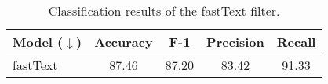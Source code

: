 \begin{table}[ht]
\centering
\fontsize{8}{10}\selectfont\setlength{\tabcolsep}{0.3em}
\begin{tabular}{@{}l>{}cccc}
\toprule
\textbf{Model ($\downarrow$)} & \textbf{Accuracy} & \textbf{F-1} & \textbf{Precision} & \textbf{Recall}\\\midrule
fastText & 87.46 & 87.20 & 83.42 & 91.33 \\\bottomrule
\end{tabular}
\caption{Classification results of the fastText filter.
}\label{tab:filter}
\end{table}
